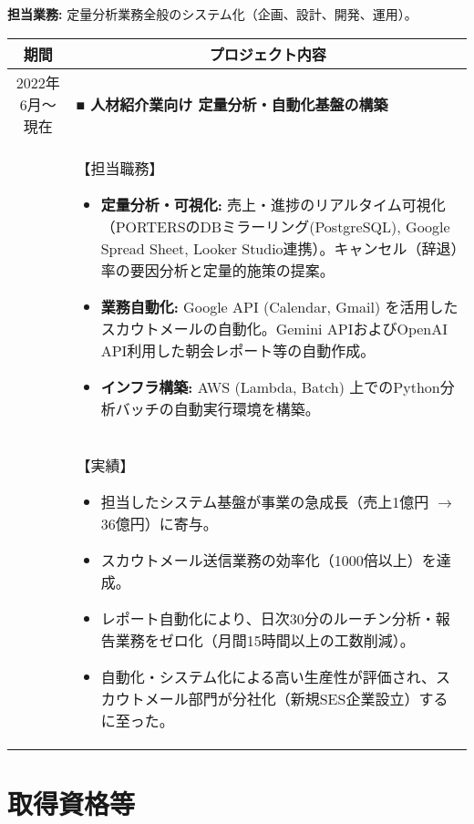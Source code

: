 \documentclass[uplatex,a4j,10.5pt,dvipdfmx]{jsarticle}
\begin{document}
\noindent\textbf{担当業務:} 定量分析業務全般のシステム化（企画、設計、開発、運用）。
\begin{longtable}{|c|p{14cm}|}
	\hline
	\multicolumn{1}{|c|}{\textbf{期間}} & \multicolumn{1}{c|}{\textbf{プロジェクト内容}} \\
	\hline
	\endhead
	\hline
	2022年6月～現在                        & \textbf{■ 人材紹介業向け 定量分析・自動化基盤の構築}       \\
	                                  & 【担当職務】
	\begin{itemize}[leftmargin=*,noitemsep]
		\item \textbf{定量分析・可視化:} 売上・進捗のリアルタイム可視化（PORTERSのDBミラーリング(PostgreSQL), Google Spread Sheet, Looker Studio連携）。キャンセル（辞退）率の要因分析と定量的施策の提案。
		\item \textbf{業務自動化:} Google API (Calendar, Gmail) を活用したスカウトメールの自動化。Gemini APIおよびOpenAI API利用した朝会レポート等の自動作成。
		\item \textbf{インフラ構築:} AWS (Lambda, Batch) 上でのPython分析バッチの自動実行環境を構築。
	\end{itemize}
	\\
	                                  & 【実績】
	\begin{itemize}[leftmargin=*,noitemsep]
		\item 担当したシステム基盤が事業の急成長（売上1億円 $\to$ 36億円）に寄与。
		\item スカウトメール送信業務の効率化（1000倍以上）を達成。
		\item レポート自動化により、日次30分のルーチン分析・報告業務をゼロ化（月間15時間以上の工数削減）。
		\item 自動化・システム化による高い生産性が評価され、スカウトメール部門が分社化（新規SES企業設立）するに至った。
	\end{itemize}
	\\
	\hline
\end{longtable}





\section{取得資格等}
\end{document}
